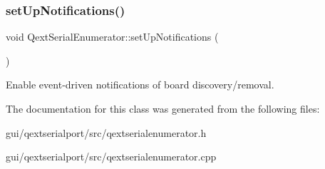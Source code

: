 \subsubsection{\texorpdfstring{set\+Up\+Notifications()}{setUpNotifications()}}
{\footnotesize\ttfamily void Qext\+Serial\+Enumerator\+::set\+Up\+Notifications (\begin{DoxyParamCaption}{ }\end{DoxyParamCaption})}

Enable event-\/driven notifications of board discovery/removal. 

The documentation for this class was generated from the following files\+:\begin{DoxyCompactItemize}
\item 
gui/qextserialport/src/qextserialenumerator.\+h\item 
gui/qextserialport/src/qextserialenumerator.\+cpp\end{DoxyCompactItemize}
